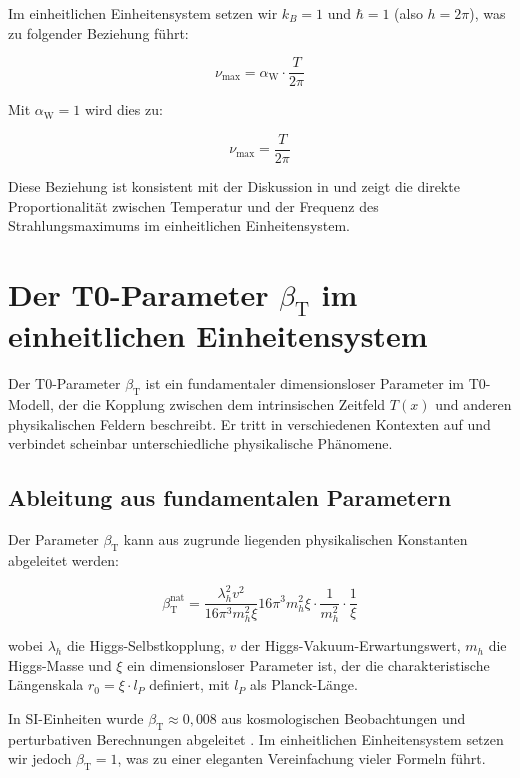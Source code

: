 \documentclass[12pt,a4paper]{article}
\newcommand{\Tfield}{T(x)}
\newcommand{\betaT}{\beta_{\text{T}}}
\newcommand{\alphaW}{\alpha_{\text{W}}}
\begin{document}
	Im einheitlichen Einheitensystem setzen wir \(k_B = 1\) und \(\hbar = 1\) (also \(h = 2\pi\)), was zu folgender Beziehung führt:
	
	\begin{equation}
		\nu_{\text{max}} = \alphaW \cdot \frac{T}{2\pi}
	\end{equation}
	
	Mit \(\alphaW = 1\) wird dies zu:
	
	\begin{equation}
		\nu_{\text{max}} = \frac{T}{2\pi}
	\end{equation}
	
	Diese Beziehung ist konsistent mit der Diskussion in \cite{pascher_temp_2025} und zeigt die direkte Proportionalität zwischen Temperatur und der Frequenz des Strahlungsmaximums im einheitlichen Einheitensystem.
	
	\section{Der T0-Parameter \(\betaT\) im einheitlichen Einheitensystem}
	\label{sec:beta_t}
	
	Der T0-Parameter \(\betaT\) ist ein fundamentaler dimensionsloser Parameter im T0-Modell, der die Kopplung zwischen dem intrinsischen Zeitfeld \(\Tfield\) und anderen physikalischen Feldern beschreibt. Er tritt in verschiedenen Kontexten auf und verbindet scheinbar unterschiedliche physikalische Phänomene.
	
	\subsection{Ableitung aus fundamentalen Parametern}
	\label{subsec:beta_derivation}
	
	Der Parameter \(\betaT\) kann aus zugrunde liegenden physikalischen Konstanten abgeleitet werden:
	
	\begin{equation}
		\label{eq:beta_fundamental}
		\betaT^{\text{nat}} = \frac{\lambda_h^2 v^2}{16\pi^3 m_h^2 \xi}{16\pi^3 m_h^2 \xi} \cdot \frac{1}{m_h^2} \cdot \frac{1}{\xi}
	\end{equation}
	
	wobei \(\lambda_h\) die Higgs-Selbstkopplung, \(v\) der Higgs-Vakuum-Erwartungswert, \(m_h\) die Higgs-Masse und \(\xi\) ein dimensionsloser Parameter ist, der die charakteristische Längenskala \(r_0 = \xi \cdot l_P\) definiert, mit \(l_P\) als Planck-Länge.
	
	In SI-Einheiten wurde \(\betaT \approx 0,008\) aus kosmologischen Beobachtungen und perturbativen Berechnungen abgeleitet \cite{pascher_params_2025}. Im einheitlichen Einheitensystem setzen wir jedoch \(\betaT = 1\), was zu einer eleganten Vereinfachung vieler Formeln führt.
	
\end{document}
